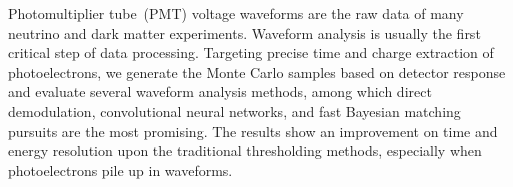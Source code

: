 Photomultiplier tube~(PMT) voltage waveforms are the raw data of many neutrino and dark matter experiments. Waveform analysis is usually the first critical step of data processing. Targeting precise time and charge extraction of photoelectrons, we generate the Monte Carlo samples based on detector response and evaluate several waveform analysis methods, among which direct demodulation, convolutional neural networks, and fast Bayesian matching pursuits are the most promising. The results show an improvement on time and energy resolution upon the traditional thresholding methods, especially when photoelectrons pile up in waveforms. 